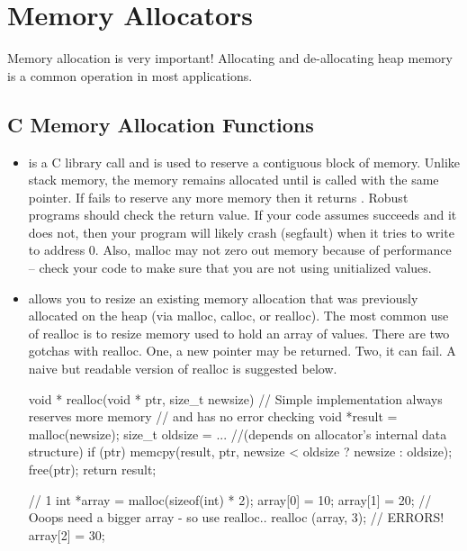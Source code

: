 \chapter{Memory Allocators}



Memory allocation is very important! Allocating and de-allocating heap memory is a common operation in most applications.

\section{C Memory Allocation Functions}

\begin{itemize}
\item {} is a C library call and is used to reserve a contiguous block of memory. Unlike stack memory, the memory remains allocated until  is called with the same pointer. If  fails to reserve any more memory then it returns . Robust programs should check the return value. If your code assumes  succeeds and it does not, then your program will likely crash (segfault) when it tries to write to address 0. Also, malloc may not zero out memory because of performance -- check your code to make sure that you are not using unitialized values.
\item {} allows you to resize an existing memory allocation that was previously allocated on the heap (via malloc, calloc, or realloc). The most common use of realloc is to resize memory used to hold an array of values. There are two gotchas with realloc. One, a new pointer may be returned. Two, it can fail. A naive but readable version of realloc is suggested below. 

\begin{code}[language=C]
void * realloc(void * ptr, size_t newsize) {
  // Simple implementation always reserves more memory
  // and has no error checking
  void *result = malloc(newsize); 
  size_t oldsize =  ... //(depends on allocator's internal data structure)
  if (ptr) memcpy(result, ptr, newsize < oldsize ? newsize : oldsize);
  free(ptr);
  return result;
}
\end{code}

\begin{code}[language=C]
// 1
int *array = malloc(sizeof(int) * 2);
array[0] = 10; array[1] = 20;
// Ooops need a bigger array - so use realloc..
realloc (array, 3); // ERRORS!
array[2] = 30; 


\end{code}
\end{itemize}
